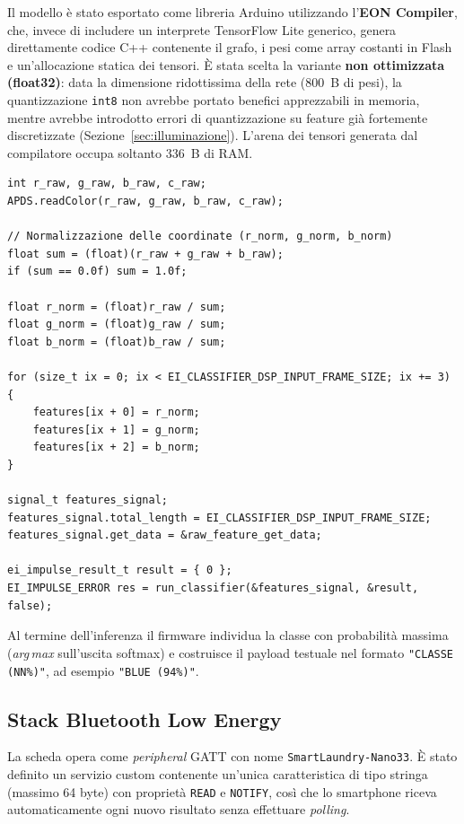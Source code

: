 \documentclass[11pt,a4paper,twoside,openany]{report}
\begin{document}
Il modello è stato esportato come libreria Arduino utilizzando l'\textbf{EON
Compiler}, che, invece di includere un interprete TensorFlow Lite
generico, genera direttamente codice C++ contenente il grafo, i pesi
come array costanti in Flash e un'allocazione statica dei tensori.
È stata scelta la variante \textbf{non ottimizzata (float32)}: data la
dimensione ridottissima della rete (\SI{800}{B} di pesi), la
quantizzazione \texttt{int8} non avrebbe portato benefici apprezzabili
in memoria, mentre avrebbe introdotto errori di quantizzazione su
feature già fortemente discretizzate (Sezione~\ref{sec:illuminazione}).
L'arena dei tensori generata dal compilatore occupa soltanto
\SI{336}{B} di RAM.

\begin{lstlisting}[caption={Normalizzazione cromatica e inferenza (estratto da \texttt{loop()}).}, label={lst:inferenza}]
int r_raw, g_raw, b_raw, c_raw;
APDS.readColor(r_raw, g_raw, b_raw, c_raw);

// Normalizzazione delle coordinate (r_norm, g_norm, b_norm)
float sum = (float)(r_raw + g_raw + b_raw);
if (sum == 0.0f) sum = 1.0f;

float r_norm = (float)r_raw / sum;
float g_norm = (float)g_raw / sum;
float b_norm = (float)b_raw / sum;

for (size_t ix = 0; ix < EI_CLASSIFIER_DSP_INPUT_FRAME_SIZE; ix += 3) {
    features[ix + 0] = r_norm;
    features[ix + 1] = g_norm;
    features[ix + 2] = b_norm;
}

signal_t features_signal;
features_signal.total_length = EI_CLASSIFIER_DSP_INPUT_FRAME_SIZE;
features_signal.get_data = &raw_feature_get_data;

ei_impulse_result_t result = { 0 };
EI_IMPULSE_ERROR res = run_classifier(&features_signal, &result, false);
\end{lstlisting}

Al termine dell'inferenza il firmware individua la classe con
probabilità massima (\textit{arg\,max} sull'uscita softmax) e costruisce
il payload testuale nel formato \texttt{"CLASSE (NN\%)"}, ad esempio
\texttt{"BLUE (94\%)"}.

\subsection{Stack Bluetooth Low Energy}

La scheda opera come \textit{peripheral} GATT con nome
\texttt{SmartLaundry-Nano33}. È stato definito un servizio custom
contenente un'unica caratteristica di tipo stringa (massimo 64 byte) con
proprietà \texttt{READ} e \texttt{NOTIFY}, così che lo smartphone riceva
automaticamente ogni nuovo risultato senza effettuare
\textit{polling}.
\end{document}
